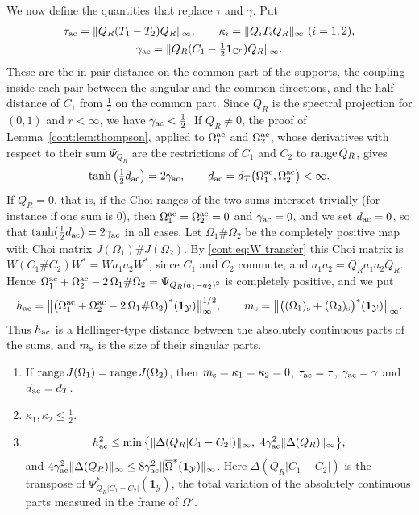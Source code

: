 We now define the quantities that replace $\tau$ and $\gamma$. Put
\begin{gather*}%
\tau_{\rm ac}=\|Q_R(T_1-T_2)Q_R\|_\infty,\qquad\kappa_i=\|Q_iT_iQ_R\|_\infty\ (i=1,2),\\ \gamma_{\rm ac}=\|Q_R(C_1-\tfrac12\mathbf{1}_{\mathbb{C}^r})Q_R\|_\infty .
\end{gather*}
These are the in-pair distance on the common part of the supports, the coupling inside each pair between the singular and the common directions, and the half-distance of $C_1$ from $\frac12$ on the common part. Since $Q_R$ is the spectral projection for $(0,1)$ and $r<\infty$, we have $\gamma_{\rm ac}<\frac12$. If $Q_R\neq0$, the proof of Lemma~\ref{cont:lem:thompson}, applied to $\Omega_1^{\rm ac}$ and $\Omega_2^{\rm ac}$, whose derivatives with respect to their sum $\Psi_{Q_R}$ are the restrictions of $C_1$ and $C_2$ to $\operatorname{range} Q_R$, gives
\[
\tanh\big(\tfrac12d_{\rm ac}\big)=2\gamma_{\rm ac},\qquad d_{\rm ac}=d_T\big(\Omega_1^{\rm ac},\Omega_2^{\rm ac}\big)<\infty .
\]
If $Q_R=0$, that is, if the Choi ranges of the two sums intersect trivially (for instance if one sum is $0$), then $\Omega_1^{\rm ac}=\Omega_2^{\rm ac}=0$ and $\gamma_{\rm ac}=0$, and we set $d_{\rm ac}=0$, so that $\tanh(\frac12d_{\rm ac})=2\gamma_{\rm ac}$ in all cases.
Let $\Omega_1\#\Omega_2$ be the completely positive map with Choi matrix $J(\Omega_1)\#J(\Omega_2)$. By \eqref{cont:eq:W transfer} this Choi matrix is $W(C_1\#C_2)W^*=Wa_1a_2W^*$, since $C_1$ and $C_2$ commute, and $a_1a_2=Q_Ra_1a_2Q_R$. Hence $\Omega_1^{\rm ac}+\Omega_2^{\rm ac}-2\,\Omega_1\#\Omega_2=\Psi_{Q_R(a_1-a_2)^2}$ is completely positive, and we put
\[
h_{\rm ac}=\big\|\big(\Omega_1^{\rm ac}+\Omega_2^{\rm ac}-2\,\Omega_1\#\Omega_2\big)^*(\mathbf{1}_{\mathcal{Y}})\big\|_\infty^{1/2},\qquad m_{\rm s}=\big\|\big((\Omega_1)_{\rm s}+(\Omega_2)_{\rm s}\big)^*(\mathbf{1}_{\mathcal{Y}})\big\|_\infty .
\]
Thus $h_{\rm ac}$ is a Hellinger-type distance between the absolutely continuous parts of the sums, and $m_{\rm s}$ is the size of their singular parts.

\begin{lemma}\label{cont:lem:support quantities}
\begin{enumerate}
\item[(a)] If $\operatorname{range} J(\Omega_1)=\operatorname{range} J(\Omega_2)$, then $m_{\rm s}=\kappa_1=\kappa_2=0$, $\tau_{\rm ac}=\tau$, $\gamma_{\rm ac}=\gamma$ and $d_{\rm ac}=d_T$.
\item[(b)] $\kappa_1,\kappa_2\leq\frac12$.
\item[(c)] \[h_{\rm ac}^2\leq\min\big\{\|\Delta(Q_R|C_1-C_2|)\|_\infty,\ 4\gamma_{\rm ac}^2\|\Delta(Q_R)\|_\infty\big\},\] and $4\gamma_{\rm ac}^2\|\Delta(Q_R)\|_\infty\leq8\gamma_{\rm ac}^2\|\overline{\Omega}^*(\mathbf{1}_{\mathcal{Y}})\|_\infty$. Here $\Delta(Q_R|C_1-C_2|)$ is the transpose of $\Psi_{Q_R|C_1-C_2|}^*(\mathbf{1}_{\mathcal{Y}})$, the total variation of the absolutely continuous parts measured in the frame of $\Omega'$.
\end{enumerate}
\end{lemma}

